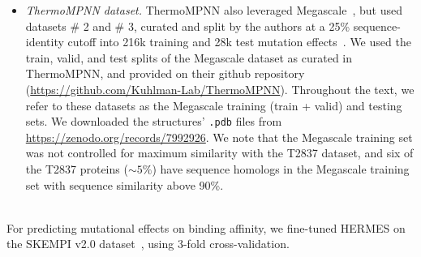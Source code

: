 \begin{itemize}
(ii) {T2837} (test set): assembled by combining several commonly used benchmarking datasets of
experimentally measured $\Delta\Delta G$ values, including S669~\citep{pancotti_predicting_2022},
myoglobin~\citep{li_predicting_2020}, ssym~\citep{pucci_quantification_2018}, and
p53~\citep{caldararu_base_2021}. The resulting test set comprises 2,837 mutations.


We obtained the cDNA117k and T2837 datasets from the Stability-Oracle~\citep{diaz_stability_2024}
github repository (\url{https://github.com/danny305/StabilityOracle/tree/master}). At the time of
access, the residue indices provided in the dataset did not correspond to the residue numbering in
the original PDB files, but instead to an intermediate, post-processed representation that was not
documented in sufficient detail to allow straightforward recovery of the original numbering. To
ensure consistency with structural data, we manually corrected the residue numbers in the CSV files
to match those in the corresponding PDB structures. The corrected versions of these datasets are
included in our repository.\\



\item {\em ThermoMPNN dataset.} 
ThermoMPNN also leveraged Megascale~\citep{tsuboyama_mega-scale_2023}, but used datasets \# 2 and \#
3, curated and split by the authors at a 25\% sequence-identity cutoff into 216k training and 28k
test mutation effects~\citep{dieckhaus_transfer_2024}. We used the train, valid, and test splits of
the Megascale dataset as curated in ThermoMPNN, and provided on their github repository
(\url{https://github.com/Kuhlman-Lab/ThermoMPNN}). Throughout the text, we refer to these datasets
as the Megascale training (train + valid) and testing sets. We downloaded the structures'
\texttt{.pdb} files from \url{https://zenodo.org/records/7992926}. We note that the Megascale
training set was not controlled for maximum similarity with the T2837 dataset, and six of the T2837
proteins ($\sim 5\%$) have sequence homologs in the Megascale training set with sequence similarity
above 90\%.
\\\\
\end{itemize}

 For predicting mutational effects on binding affinity, we
fine-tuned HERMES on the SKEMPI v2.0 dataset~\citep{jankauskaite_skempi_2019}, using 3-fold
cross-validation.


